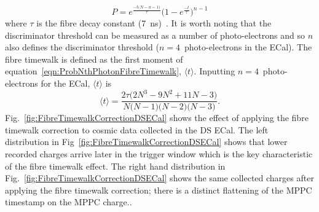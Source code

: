 {\begin{equation}
P = e^{\frac{-t\big(N-n-1\big)}{\tau}}\big(1-e^{\frac{-t}{\tau}}\big)^{n-1}
\label{eqn:ProbNthPhotonFibreTimewalk}
\end{equation}
where $\tau$ is the fibre decay constant (7~ns)~\cite{ND280CalibTN}.  It is worth noting that the discriminator threshold can be measured as a number of photo-electrons and so $n$ also defines the discriminator threshold ($n=4$~photo-electrons in the ECal).  The fibre timewalk is defined as the first moment of equation~\ref{eqn:ProbNthPhotonFibreTimewalk}, $\langle t \rangle$.  Inputting $n=4$~photo-electrons for the ECal, $\langle t \rangle$ is 
\begin{equation}
\langle t \rangle = \frac{2\tau\big(2N^3-9N^2+11N-3\big)}{N\big(N-1\big)\big(N-2\big)\big(N-3\big)}.
\end{equation}
Fig.~\ref{fig:FibreTimewalkCorrectionDSECal} shows the effect of applying the fibre timewalk correction to cosmic data collected in the DS ECal.  The left distribution in Fig~\ref{fig:FibreTimewalkCorrectionDSECal} shows that lower recorded charges arrive later in the trigger window which is the key characteristic of the fibre timewalk effect.  The right hand distribution in Fig.~\ref{fig:FibreTimewalkCorrectionDSECal} shows the same collected charges after applying the fibre timewalk correction; there is a distinct flattening of the MPPC timestamp on the MPPC charge.}.
